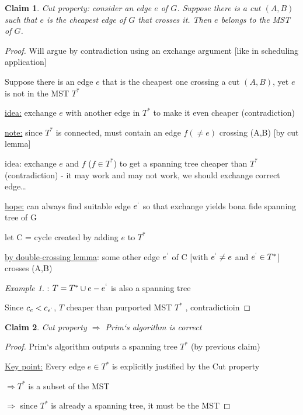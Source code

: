 \documentclass[a4paper,12pt]{article}
\theoremstyle{plain}
\newtheorem{claim}{Claim}
\theoremstyle{definition}
\theoremstyle{remark}
\newtheorem*{example}{Example}
\begin{document}
\begin{claim}
Cut property: consider an edge $e$ of $G$. Suppose there is a cut $(A,B)$ such that $e$ is the cheapest edge of $G$ that crosses it. Then $e$ belongs to the MST of $G$.
\end{claim}
\begin{proof}
Will argue by contradiction using an exchange argument [like in scheduling application]

Suppose there is an edge $e$ that is the cheapest one crossing a cut $(A,B)$, yet $e$ is not in the MST $T^*$

\underline{idea:} exchange $e$ with another edge in $T^*$ to make it even cheaper (contradiction)

\underline{note:} since $T^*$ is connected, must contain an edge $f (\neq e)$ crossing (A,B) [by cut lemma]

idea: exchange $e$ and $f$ ($f \in T^*$) to get a spanning tree cheaper than $T^*$ (contradiction) - it may work and may not work, we should exchange correct edge\dots

\underline{hope:} can always find suitable edge $e^`$ so that exchange yields bona fide spanning tree of G

let C = cycle created by adding $e$ to $T^*$

\underline{by double-crossing lemma}: some other edge $e^`$ of C [with $e^` \neq e$ and $e^` \in T^*$] crosses (A,B)

\begin{example}: $T = T^* \cup {e} - {e^`}$ is also a spanning tree\end{example}

Since $c_e < c_{e^`}$, $T$ cheaper than purported MST $T^*$	, contradictioin
\end{proof}

\begin{claim} Cut property $\Rightarrow$ Prim`s algorithm is correct\end{claim}
\begin{proof}
Prim`s algorithm outputs a spanning tree $T^*$ (by previous claim)

\underline{Key point:} Every edge $e \in T^*$ is explicitly justified by the Cut property

$\Rightarrow T^*$ is a subset of the MST

$\Rightarrow$ since $T^*$ is already a spanning tree, it must be the MST
\end{proof}
\end{document}
